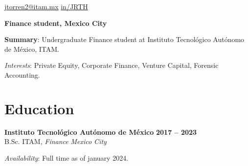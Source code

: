 \documentclass[letter]{resume}
\begin{document}
\begin{center}
{\href{mailto://jtorren2@itam.mx}{jtorren2@itam.mx}}
{\href{https://www.linkedin.com/in/jrth}{in/JRTH}}

{\bf Finance student, Mexico City}

{\bf Summary}: {Undergraduate Finance student at Instituto Tecnológico Autónomo de México, ITAM.}

\emph{Interests}: {Private Equity, Corporate Finance, Venture Capital, Forensic Accounting.}
\end{center}

\section{Education} 
\begin{content}
{\bf Instituto Tecnológico Autónomo de México} \emph {} \hfill {\bf 2017 -- 2023} \\ 
{B.Sc. ITAM, \emph{Finance}} \hfill \emph {Mexico City}

\emph{Availability}: {Full time as of january 2024.}

\sectionlineskip
\end{content}

\end{document}

